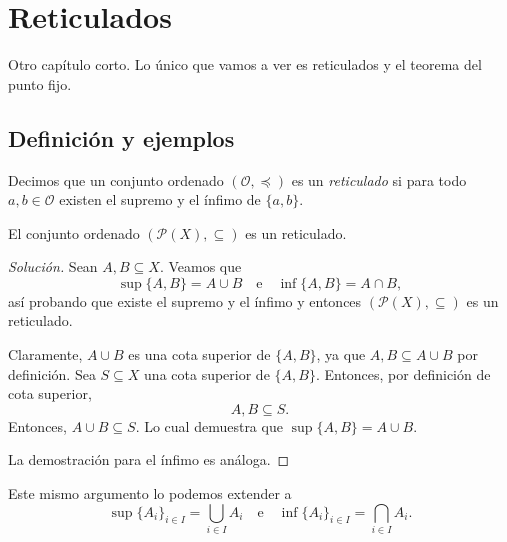 \chapter{Reticulados}

Otro capítulo corto. Lo único que vamos a ver es reticulados y el teorema del punto fijo.

\section{Definición y ejemplos}

\begin{definition}
	Decimos que un conjunto ordenado $(\mathcal{O}, \preceq)$ es un \emph{reticulado} si para todo $a, b \in \mathcal{O}$ existen el supremo y el ínfimo de $\{ a, b \}$.
\end{definition}

\begin{example}
	El conjunto ordenado $(\mathcal{P}(X), \subseteq)$ es un reticulado.
\end{example}

\begin{proof}[Solución]
	Sean $A, B \subseteq X$. Veamos que
	\begin{equation*}
		\sup \{ A, B \} = A \cup B \quad \text{e} \quad \inf \{ A, B \} = A \cap B,
	\end{equation*}
	así probando que existe el supremo y el ínfimo y entonces $(\mathcal{P}(X), \subseteq)$ es un reticulado.

	Claramente, $A \cup B$ es una cota superior de $\{ A, B \}$, ya que $A, B \subseteq A \cup B$ por definición. Sea $S \subseteq X$ una cota superior de $\{ A, B \}$. Entonces, por definición de cota superior,
	\begin{equation*}
		A, B \subseteq S.
	\end{equation*}
	Entonces, $A \cup B \subseteq S$. Lo cual demuestra que $\sup \{ A, B \} = A \cup B$.

	La demostración para el ínfimo es análoga.
\end{proof}

\begin{remark}
	Este mismo argumento lo podemos extender a
	\begin{equation*}
		\sup \{ A_i \}_{i \in I} = \bigcup_{i \in I} A_i \quad \text{e} \quad \inf \{ A_i \}_{i \in I} = \bigcap_{i \in I} A_i.
	\end{equation*}
\end{remark}

